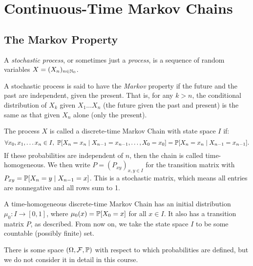 \documentclass{article}
\begin{document}
\makecover

\section{Continuous-Time Markov Chains}
\subsection{The Markov Property}

A \textit{stochastic process}, or sometimes just a \textit{process}, is a sequence of random variables $X = (X_n)_{\ninn_0}$.

\begin{definition}
    A stochastic process is said to have the \textit{Markov} property if the future and the past are independent, given the present. That is, for any $k > n$, the conditional distribution of $X_k$ given $X_1 \dots X_n$ (the future given the past and present) is the same as that given $X_n$ alone (only the present).
    
    The process $X$ is called a discrete-time Markov Chain with state space $I$ if:
	\[
	\forall x_0, x_1, \dots x_n \in I, \ \P[X_n = x_n \mid X_{n-1} = x_{n-1}, \dots, X_0 = x_0] = \P[X_n = x_n \mid X_{n-1} = x_{n-1}].
	\]
	If these probabilities are independent of $n$, then the chain is called time-homogeneous. We then write $P = (P_{xy})_{x,y\in I}$ for the transition matrix with $P_{xy} = \P[X_n = y \mid X_{n-1} = x]$. This is a stochastic matrix, which means all entries are nonnegative and all rows sum to 1.
\end{definition}






A time-homogeneous discrete-time Markov Chain has an initial distribution $\mu_0 : I \to [0, 1]$, where $\mu_0(x) = \P[X_0 = x]$ for all $x \in I$. It also has a transition matrix $P$, as described. From now on, we take the state space $I$ to be some countable (possibly finite) set.

\begin{note}
	There is some space $(\Omega, \calF, \P)$ with respect to which probabilities are defined, but we do not consider it in detail in this course.
\end{note}
\end{document}
